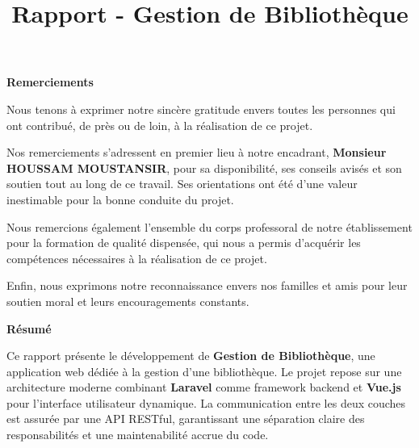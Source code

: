 \documentclass{rapportPFA}
\title{Rapport - Gestion de Bibliothèque}
\begin{document}




\fairemarges
\fairepagedegarde

\pagestyle{empty}
\makeatletter
\let\ps@plain\ps@empty
\makeatother


\newpage
\thispagestyle{empty}
{}
\vspace*{3cm}
\begin{center}
    {\LARGE \textbf{Remerciements}}
\end{center}
\vspace{2cm}

Nous tenons à exprimer notre sincère gratitude envers toutes les personnes qui ont
contribué, de près ou de loin, à la réalisation de ce projet.

Nos remerciements s'adressent en premier lieu à notre encadrant,
\textbf{Monsieur HOUSSAM MOUSTANSIR}, pour sa disponibilité, ses conseils avisés
et son soutien tout au long de ce travail. Ses orientations ont été d'une valeur
inestimable pour la bonne conduite du projet.

Nous remercions également l'ensemble du corps professoral de notre établissement
pour la formation de qualité dispensée, qui nous a permis d'acquérir les
compétences nécessaires à la réalisation de ce projet.

Enfin, nous exprimons notre reconnaissance envers nos familles et amis pour leur
soutien moral et leurs encouragements constants.

\newpage
\thispagestyle{empty}
{}
\vspace*{3cm}
\begin{center}
    {\LARGE \textbf{Résumé}}
\end{center}
\vspace{2cm}

Ce rapport présente le développement de \textbf{Gestion de Bibliothèque}, une application web
dédiée à la gestion d'une bibliothèque. Le projet repose sur une architecture
moderne combinant \textbf{Laravel} comme framework backend et \textbf{Vue.js} pour
l'interface utilisateur dynamique. La communication entre les deux couches est assurée
par une API RESTful, garantissant une séparation claire des responsabilités et une
maintenabilité accrue du code.
\end{document}
